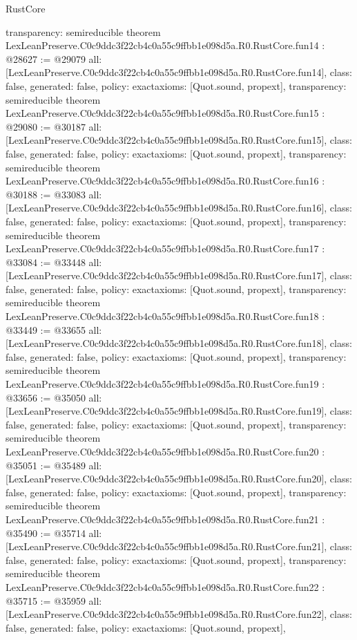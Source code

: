 \begin{lexlean}{RustCore}
\begin{coremodule}
{  transparency: semireducible
}
theorem LexLeanPreserve.C0c9ddc3f22cb4c0a55c9ffbb1e098d5a.R0.RustCore.fun14 : @28627 := @29079 {
  all: [LexLeanPreserve.C0c9ddc3f22cb4c0a55c9ffbb1e098d5a.R0.RustCore.fun14],
  class: false,
  generated: false,
  policy: exact{axioms: [Quot.sound, propext]},
  transparency: semireducible
}
theorem LexLeanPreserve.C0c9ddc3f22cb4c0a55c9ffbb1e098d5a.R0.RustCore.fun15 : @29080 := @30187 {
  all: [LexLeanPreserve.C0c9ddc3f22cb4c0a55c9ffbb1e098d5a.R0.RustCore.fun15],
  class: false,
  generated: false,
  policy: exact{axioms: [Quot.sound, propext]},
  transparency: semireducible
}
theorem LexLeanPreserve.C0c9ddc3f22cb4c0a55c9ffbb1e098d5a.R0.RustCore.fun16 : @30188 := @33083 {
  all: [LexLeanPreserve.C0c9ddc3f22cb4c0a55c9ffbb1e098d5a.R0.RustCore.fun16],
  class: false,
  generated: false,
  policy: exact{axioms: [Quot.sound, propext]},
  transparency: semireducible
}
theorem LexLeanPreserve.C0c9ddc3f22cb4c0a55c9ffbb1e098d5a.R0.RustCore.fun17 : @33084 := @33448 {
  all: [LexLeanPreserve.C0c9ddc3f22cb4c0a55c9ffbb1e098d5a.R0.RustCore.fun17],
  class: false,
  generated: false,
  policy: exact{axioms: [Quot.sound, propext]},
  transparency: semireducible
}
theorem LexLeanPreserve.C0c9ddc3f22cb4c0a55c9ffbb1e098d5a.R0.RustCore.fun18 : @33449 := @33655 {
  all: [LexLeanPreserve.C0c9ddc3f22cb4c0a55c9ffbb1e098d5a.R0.RustCore.fun18],
  class: false,
  generated: false,
  policy: exact{axioms: [Quot.sound, propext]},
  transparency: semireducible
}
theorem LexLeanPreserve.C0c9ddc3f22cb4c0a55c9ffbb1e098d5a.R0.RustCore.fun19 : @33656 := @35050 {
  all: [LexLeanPreserve.C0c9ddc3f22cb4c0a55c9ffbb1e098d5a.R0.RustCore.fun19],
  class: false,
  generated: false,
  policy: exact{axioms: [Quot.sound, propext]},
  transparency: semireducible
}
theorem LexLeanPreserve.C0c9ddc3f22cb4c0a55c9ffbb1e098d5a.R0.RustCore.fun20 : @35051 := @35489 {
  all: [LexLeanPreserve.C0c9ddc3f22cb4c0a55c9ffbb1e098d5a.R0.RustCore.fun20],
  class: false,
  generated: false,
  policy: exact{axioms: [Quot.sound, propext]},
  transparency: semireducible
}
theorem LexLeanPreserve.C0c9ddc3f22cb4c0a55c9ffbb1e098d5a.R0.RustCore.fun21 : @35490 := @35714 {
  all: [LexLeanPreserve.C0c9ddc3f22cb4c0a55c9ffbb1e098d5a.R0.RustCore.fun21],
  class: false,
  generated: false,
  policy: exact{axioms: [Quot.sound, propext]},
  transparency: semireducible
}
theorem LexLeanPreserve.C0c9ddc3f22cb4c0a55c9ffbb1e098d5a.R0.RustCore.fun22 : @35715 := @35959 {
  all: [LexLeanPreserve.C0c9ddc3f22cb4c0a55c9ffbb1e098d5a.R0.RustCore.fun22],
  class: false,
  generated: false,
  policy: exact{axioms: [Quot.sound, propext]},
}
\end{coremodule}
\end{lexlean}
